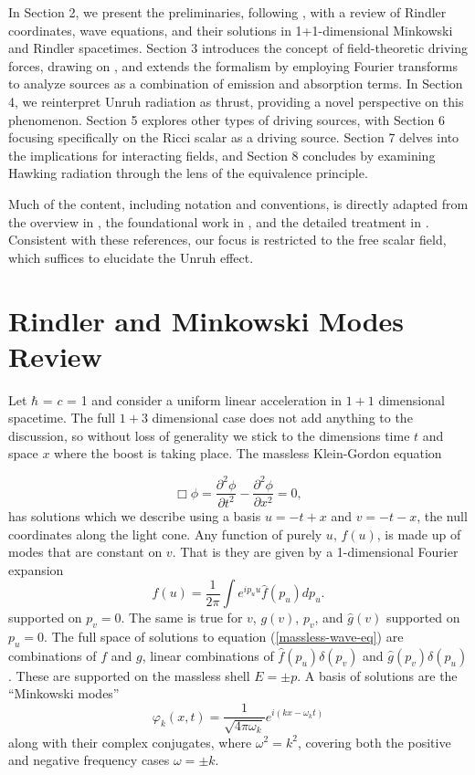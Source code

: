 \documentclass[12pt,a4paper]{article}
\begin{document}
In Section 2, we present the preliminaries, following \cite{Frodden}, with a review of Rindler coordinates, wave equations, and their solutions in 1+1-dimensional Minkowski and Rindler spacetimes. Section 3 introduces the concept of field-theoretic driving forces, drawing on \cite{beisert}, and extends the formalism by employing Fourier transforms to analyze sources as a combination of emission and absorption terms. In Section 4, we reinterpret Unruh radiation as thrust, providing a novel perspective on this phenomenon. Section 5 explores other types of driving sources, with Section 6 focusing specifically on the Ricci scalar as a driving source. Section 7 delves into the implications for interacting fields, and Section 8 concludes by examining Hawking radiation through the lens of the equivalence principle.


Much of the content, including notation and conventions, is directly adapted from the overview in \cite{Frodden}, the foundational work in \cite{unruh}, and the detailed treatment in \cite{beisert}. Consistent with these references, our focus is restricted to the free scalar field, which suffices to elucidate the Unruh effect.

\section{Rindler and Minkowski Modes Review}

Let $\hbar$ = $c$ = 1 and consider a uniform linear acceleration in $1+1$ dimensional spacetime. The full $1+3$ dimensional case does not add anything to the discussion, so without loss of generality we stick to the dimensions time $t$ and space $x$ where the boost is taking place.  The massless Klein-Gordon equation 

\begin{equation}
  \Box \phi = \frac{\partial^2 \phi}{\partial t^2} - \frac{\partial^2 \phi}{\partial x^2} = 0,
 \label{massless-wave-eq}
\end{equation}
has solutions which we describe using a basis  $u = -t + x$ and $v = -t - x$, the null coordinates along the light cone.  Any function of purely $u$, $f(u)$, is made up of modes that are constant on $v$.  That is they are given by a 1-dimensional Fourier expansion
\begin{equation}
  f(u) = \frac{1}{2\pi} \int{e^{i p_u u} \hat{f}(p_u) dp_u}.
\end{equation}
supported on $p_v = 0$.  The same is true for $v$, $g(v)$, $p_v$, and $\hat{g}(v)$ supported on $p_u = 0$.  The full space of solutions to equation (\ref{massless-wave-eq}) are combinations of $f$ and $g$, linear combinations of $\hat{f}(p_u) \delta(p_v)$ and $\hat{g}(p_v) \delta(p_u)$.  These are supported on the massless shell $E = \pm p$.  A basis of solutions are the ``Minkowski modes''
\begin{equation}
  \varphi_k(x,t) = \frac{1}{\sqrt{4 \pi \omega_k}} e^{i(k x - \omega_k t)}
\end{equation}
along with their complex conjugates, where $\omega^2 = k^2$, covering both the positive and negative frequency cases $\omega = \pm k$.
\end{document}
